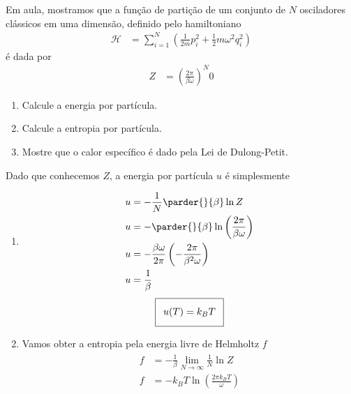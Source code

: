 \begin{prob}
  Em aula, mostramos que a função de partição de um conjunto de $N$ osciladores clássicos em uma dimensão, definido pelo hamiltoniano
  \begin{align}
    \mathcal{H}&=\sum_{i=1}^N\left(\frac{1}{2m}p^2_i+\frac{1}{2}m\omega^2q_i^2\right)
  \end{align}
  é dada por
  \begin{align}
    Z&=\left(\frac{2\pi}{\beta\omega}\right)^N0
  \end{align}
  \begin{enumerate}[label=\alph *)]
    \item Calcule a energia por partícula.
    \item Calcule a entropia por partícula.
    \item Mostre que o calor específico é dado pela Lei de Dulong-Petit.
  \end{enumerate}
  \begin{sol}
    Dado que conhecemos $Z$, a energia por partícula $u$ é simplesmente
    \begin{enumerate}[label=\alph *)]
      \item 
      \begin{align}
        \begin{split}
          u&=-\frac{1}{N}\parder{}{\beta}\ln Z\\
          u&=-\parder{}{\beta}\ln\left(\frac{2\pi}{\beta\omega}\right)\\
          u&=-\frac{\beta\omega}{2\pi}\left(-\frac{2\pi}{\beta^2\omega}\right)\\
          u&=\frac{1}{\beta}
        \end{split}
      \end{align}
      \begin{align}
        \addtolength{\fboxsep}{5pt}
        \boxed{
          \begin{gathered}
            u(T)=k_BT
          \end{gathered}
        }
      \end{align}
      \item Vamos obter a entropia pela energia livre de Helmholtz $f$
      \begin{align}
        \begin{split}
          f&=-\frac{1}{\beta}\lim_{N\to \infty}\frac{1}{N}\ln Z\\
          f&=-k_BT\ln\left(\frac{2\pi k_BT}{\omega}\right)

\end{split}
\end{align}
\end{enumerate}
\end{sol}
\end{prob}
